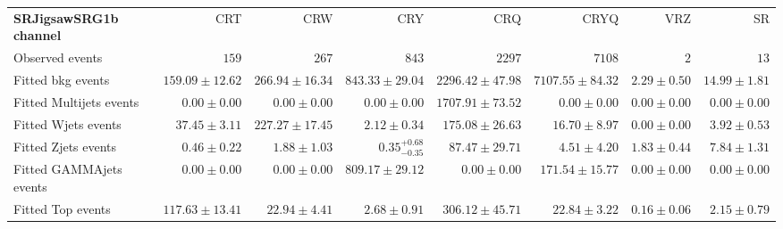 

\begin{table}
\begin{center}
\setlength{\tabcolsep}{0.0pc}
{\tiny
\begin{tabular*}{\textwidth}{@{\extracolsep{\fill}}lrrrrrrr}
\noalign{\smallskip}\hline\noalign{\smallskip}
{\bf SRJigsawSRG1b channel}           & CRT            & CRW            & CRY            & CRQ            & CRYQ            & VRZ            & SR              \\[-0.05cm]
\noalign{\smallskip}\hline\noalign{\smallskip}
Observed events          & $159$              & $267$              & $843$              & $2297$              & $7108$              & $2$              & $13$                    \\
\noalign{\smallskip}\hline\noalign{\smallskip}
Fitted bkg events         & $159.09 \pm 12.62$          & $266.94 \pm 16.34$          & $843.33 \pm 29.04$          & $2296.42 \pm 47.98$          & $7107.55 \pm 84.32$          & $2.29 \pm 0.50$          & $14.99 \pm 1.81$              \\
\noalign{\smallskip}\hline\noalign{\smallskip}
        Fitted Multijets events         & $0.00 \pm 0.00$          & $0.00 \pm 0.00$          & $0.00 \pm 0.00$          & $1707.91 \pm 73.52$          & $0.00 \pm 0.00$          & $0.00 \pm 0.00$          & $0.00 \pm 0.00$              \\
        Fitted Wjets events         & $37.45 \pm 3.11$          & $227.27 \pm 17.45$          & $2.12 \pm 0.34$          & $175.08 \pm 26.63$          & $16.70 \pm 8.97$          & $0.00 \pm 0.00$          & $3.92 \pm 0.53$              \\
        Fitted Zjets events         & $0.46 \pm 0.22$          & $1.88 \pm 1.03$          & $0.35_{-0.35}^{+0.68}$          & $87.47 \pm 29.71$          & $4.51 \pm 4.20$          & $1.83 \pm 0.44$          & $7.84 \pm 1.31$              \\
        Fitted GAMMAjets events         & $0.00 \pm 0.00$          & $0.00 \pm 0.00$          & $809.17 \pm 29.12$          & $0.00 \pm 0.00$          & $171.54 \pm 15.77$          & $0.00 \pm 0.00$          & $0.00 \pm 0.00$              \\
        Fitted Top events         & $117.63 \pm 13.41$          & $22.94 \pm 4.41$          & $2.68 \pm 0.91$          & $306.12 \pm 45.71$          & $22.84 \pm 3.22$          & $0.16 \pm 0.06$          & $2.15 \pm 0.79$              \\

\end{tabular*}}
\end{center}
\end{table}
